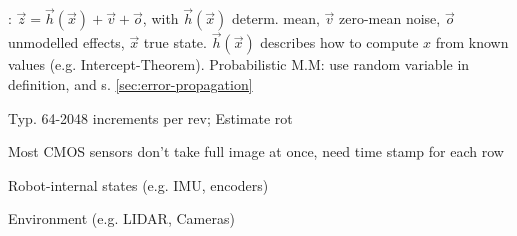 \label{sec:sensors}
: $\vec{z} = \vec{h}(\vec{x}) + \vec{v} + \vec{o}$, with $\vec{h}(\vec{x})$ determ. mean,
$\vec{v}$ zero-mean noise, $\vec{o}$ unmodelled effects, $\vec{x}$ true state.
$\vec{h}(\vec{x})$ describes how to compute $x$ from known values (e.g. Intercept-Theorem).
Probabilistic M.M: use random variable in definition, and s. \ref{sec:error-propagation}

 Typ. 64-2048 increments per rev; Estimate rot

 Most CMOS sensors don't take full image at once, need time stamp for each row

\shortdefinition[Proprioceptive] Robot-internal states (e.g. IMU, encoders)

\shortdefinition[Exteroceptive] Environment (e.g. LIDAR, Cameras)
